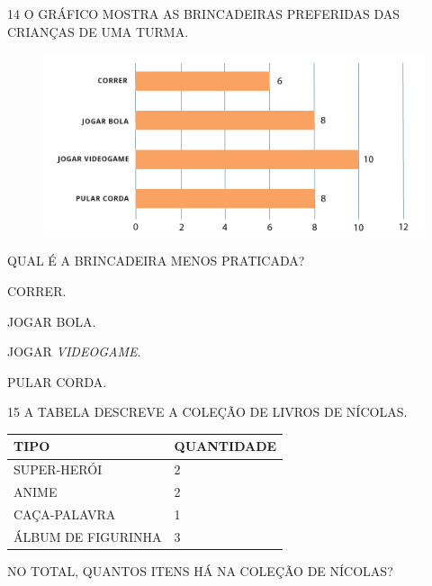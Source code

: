 \num{14} O GRÁFICO MOSTRA AS BRINCADEIRAS PREFERIDAS DAS CRIANÇAS DE UMA TURMA.

\begin{figure}[H]
\includegraphics[width=\textwidth]{./media/SAEB_1ANO_MAT_FIGURA134.png}
\end{figure}

\pagebreak
QUAL É A BRINCADEIRA MENOS PRATICADA?

\begin{escolha}
\item CORRER.

\item JOGAR BOLA.

\item JOGAR \textit{VIDEOGAME}.

\item PULAR CORDA.
\end{escolha}

\num{15} A TABELA DESCREVE A COLEÇÃO DE LIVROS DE NÍCOLAS.


\begin{table}[!ht]
    \centering
    \begin{tabular}{|l|l|}
    \hline
        \textbf{TIPO} & \textbf{QUANTIDADE} \\ \hline
        SUPER-HERÓI & 2 \\ \hline
        ANIME & 2 \\ \hline
        CAÇA-PALAVRA & 1 \\ \hline
        ÁLBUM DE FIGURINHA & 3 \\ \hline
    \end{tabular}
\end{table}

NO TOTAL, QUANTOS ITENS HÁ NA COLEÇÃO DE NÍCOLAS?


